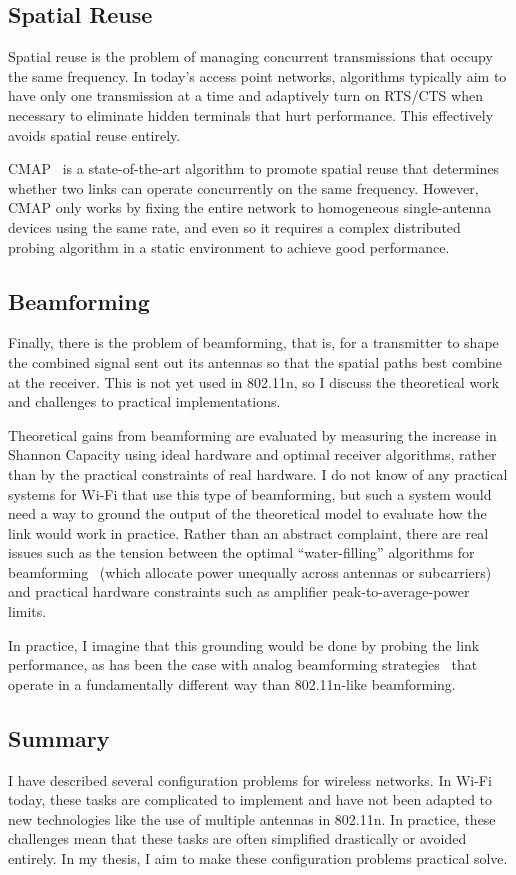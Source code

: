 \subsection{Spatial Reuse}
Spatial reuse is the problem of managing concurrent transmissions that occupy the same frequency. In today's access point networks, algorithms typically aim to have only one transmission at a time and adaptively turn on RTS/CTS when necessary to eliminate hidden terminals that hurt performance. This effectively avoids spatial reuse entirely.

CMAP~\cite{Vutukuru_CMAP} is a state-of-the-art algorithm to promote spatial reuse that determines whether two links can operate concurrently on the same frequency. However, CMAP only works by fixing the entire network to homogeneous single-antenna devices using the same rate, and even so it requires a complex distributed probing algorithm in a static environment to achieve good performance.

\subsection{Beamforming}
Finally, there is the problem of beamforming, that is, for a transmitter to shape the combined signal sent out its antennas so that the spatial paths best combine at the receiver. This is not yet used in 802.11n, so I discuss the theoretical work and challenges to practical implementations.

Theoretical gains from beamforming are evaluated by measuring the increase in Shannon Capacity using ideal hardware and optimal receiver algorithms, rather than by the practical constraints of real hardware. I do not know of any practical systems for Wi-Fi that use this type of beamforming, but such a system would need a way to ground the output of the theoretical model to evaluate how the link would work in practice. Rather than an abstract complaint, there are real issues such as the tension between the optimal ``water-filling'' algorithms for beamforming~\cite{Tse} (which allocate power unequally across antennas or subcarriers) and practical hardware constraints such as amplifier peak-to-average-power limits.

In practice, I imagine that this grounding would be done by probing the link performance, as has been the case with analog beamforming strategies~\cite{Liu_DIRC} that operate in a fundamentally different way than 802.11n-like beamforming.

\subsection{Summary}
I have described several configuration problems for wireless networks. In Wi-Fi today, these tasks are complicated to implement and have not been adapted to new technologies like the use of multiple antennas in 802.11n. In practice, these challenges mean that these tasks are often simplified drastically or avoided entirely. In my thesis, I aim to make these configuration problems practical solve.

